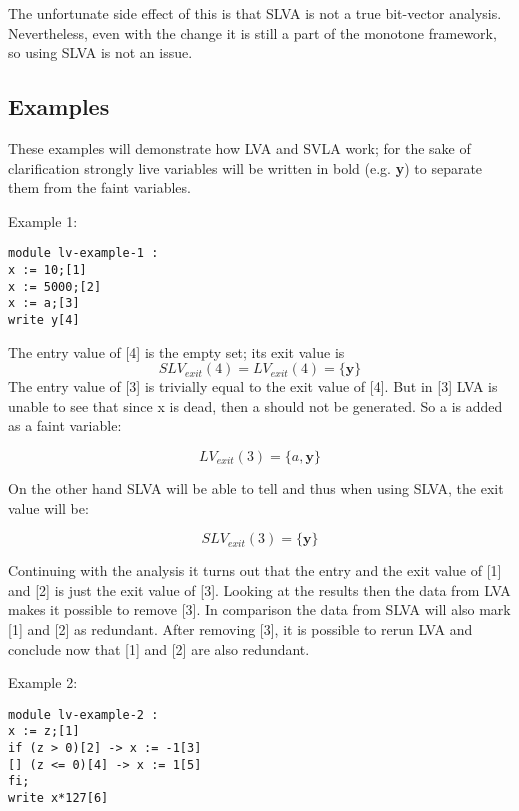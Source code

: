 \docpar
The unfortunate side effect of this is that SLVA is not a true bit-vector
analysis. Nevertheless, even with the change it is still a part of the
monotone framework, so using SLVA is not an issue.

\subsection{Examples}
These examples will demonstrate how LVA and SVLA work; for the sake of
clarification strongly live variables will be written in bold
(e.g. \textbf{y}) to separate them from the faint variables.

\docpar
Example 1:
\begin{lstlisting}
module lv-example-1 :
x := 10;[1]
x := 5000;[2]
x := a;[3]
write y[4]
\end{lstlisting}
The entry value of [4] is the empty set; its
exit value is 
\[ SLV_{exit}(4) = LV_{exit}(4) = \{\textbf{y}\}\]
The entry value of [3] is trivially equal to the
exit value of [4]. But in [3] LVA is unable to see
that since x is dead, then a should not be
generated. So a is added as a faint variable:

\[LV_{exit}(3) = \{a, \textbf{y}\}\]

On the other hand SLVA will be able to tell and thus
when using SLVA, the exit value will be:

\[SLV_{exit}(3) = \{\textbf{y}\}\]

Continuing with the analysis it turns out that the
entry and the exit value of [1] and [2] is just the
exit value of [3]. Looking at the results then the
data from LVA makes it possible to remove [3].
In comparison the data from SLVA will also mark [1]
and [2] as redundant.
  After removing [3], it is possible to rerun LVA
and conclude now that [1] and [2] are also redundant.

\docpar
Example 2:
\begin{lstlisting}
module lv-example-2 :
x := z;[1]
if (z > 0)[2] -> x := -1[3]
[] (z <= 0)[4] -> x := 1[5]
fi;
write x*127[6]
\end{lstlisting}



